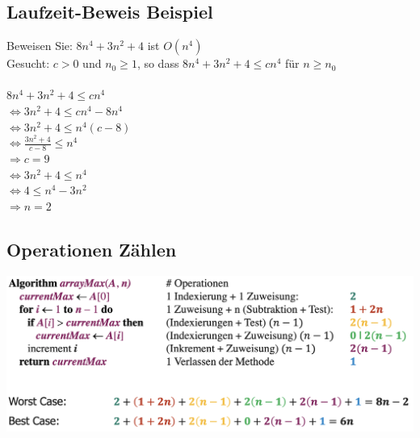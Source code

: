 \documentclass[a4paper, landscape, 8pt]{scrartcl}
\begin{document}
\begin{multicols*}{4}
            \subsection{Laufzeit-Beweis Beispiel}
                Beweisen Sie: $8n^4 + 3n^2 + 4$ ist $O(n^4)$ \\
                Gesucht: $c > 0$ und $n_0 \geq 1$, so dass $8n^4 + 3n^2 + 4 \leq cn^4$ für $n \geq n_0$ \\
                  \\
                $8n^4 + 3n^2 + 4 \leq cn^4$\\
                $\Leftrightarrow 3n^2 + 4 \leq cn^4 - 8n^4$\\
                $\Leftrightarrow 3n^2 + 4 \leq n^4(c-8)$\\
                $\Leftrightarrow \frac{3n^2 + 4}{c-8} \leq n^4$\\
                $\Rightarrow c = 9$\\
                $\Leftrightarrow 3n^2 + 4 \leq n^4$\\
                $\Leftrightarrow 4 \leq n^4 - 3n^2$\\
                $\Rightarrow n = 2$\\

        \subsection{Operationen Zählen}
                \includegraphics[scale=0.17]{graphic/04_primitive_operationen_zaehlen}


\end{multicols*}
\end{document}
